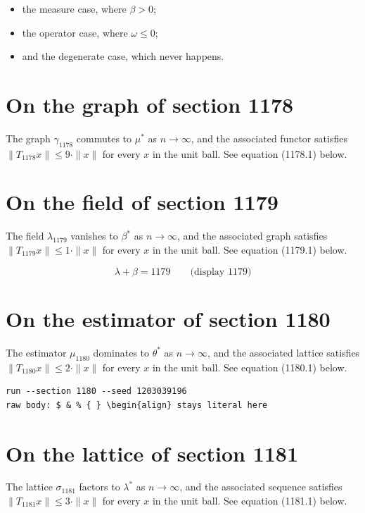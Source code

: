 \documentclass{article}
\begin{document}
\begin{itemize}
  \item the measure case, where $\beta > 0$;
  \item the operator case, where $\omega \leq 0$;
  \item and the degenerate case, which never happens.
\end{itemize}

\section{On the graph of section 1178}
The graph $\gamma_{1178}$ commutes to $\mu^{*}$ as $n \to \infty$,
and the associated functor satisfies $\|T_{1178} x\| \leq 9 \cdot \|x\|$
for every $x$ in the unit ball. See equation (1178.1) below.

\section{On the field of section 1179}
The field $\lambda_{1179}$ vanishes to $\beta^{*}$ as $n \to \infty$,
and the associated graph satisfies $\|T_{1179} x\| \leq 1 \cdot \|x\|$
for every $x$ in the unit ball. See equation (1179.1) below.

$$
\lambda + \beta = 1179 \qquad \text{(display 1179)}
$$

\section{On the estimator of section 1180}
The estimator $\mu_{1180}$ dominates to $\theta^{*}$ as $n \to \infty$,
and the associated lattice satisfies $\|T_{1180} x\| \leq 2 \cdot \|x\|$
for every $x$ in the unit ball. See equation (1180.1) below.

\begin{verbatim}
run --section 1180 --seed 1203039196
raw body: $ & % { } \begin{align} stays literal here
\end{verbatim}

\section{On the lattice of section 1181}
The lattice $\sigma_{1181}$ factors to $\lambda^{*}$ as $n \to \infty$,
and the associated sequence satisfies $\|T_{1181} x\| \leq 3 \cdot \|x\|$
for every $x$ in the unit ball. See equation (1181.1) below.
\end{document}
